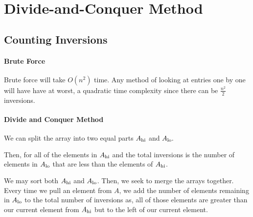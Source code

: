 
\section{Divide-and-Conquer Method}

\subsection{Counting Inversions}

\paragraph{Brute Force}
Brute force will take \(O(n^2)\) time. Any method of looking at entries
one by one will have have at worst, a quadratic time complexity
since there can be \(\frac{n^2}{2}\) inversions.

\paragraph{Divide and Conquer Method}
We can split the array into two equal parts \(A_{\mathrm{hi}}\) and \(A_{\mathrm{lo}}.\)

Then, for all of the elements in \(A_{\mathrm{hi}}\) and the total inversions is
the number of elements in \(A_{\mathrm{lo}}\) that are less than the elements of
\(A_{\mathrm{hi}}\).

We may sort both \(A_{\mathrm{hi}}\) and \(A_{\mathrm{lo}}\).
Then, we seek to merge the arrays together. Every time we pull an element
from \(A\), we add the number of elements remaining in \(A_{\mathrm{lo}}\)
to the total number of inversions as, all of those elements are greater than
our current element from \(A_{\mathrm{hi}}\) but to the left of our current element.

